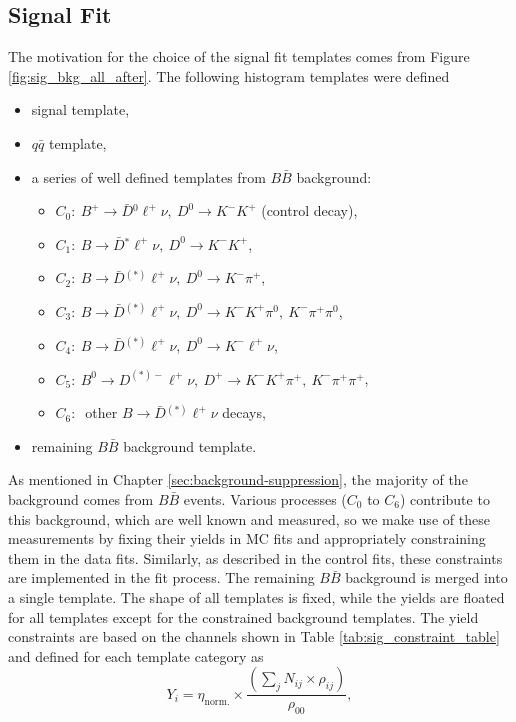 \subsection{Signal Fit}\label{sec:templates-in-signal-fits}
The motivation for the choice of the signal fit templates comes from Figure \ref{fig:sig_bkg_all_after}. The following histogram templates were defined
\begin{itemize}
	\item signal template,
	\item $q \bar q$ template,
	\item a series of well defined templates from $B \bar B$ background:
	\begin{itemize}
		\item $C_0:~B^+ \to \bar{D} {}^0 \ell^+ \nu,~D^0 \to K^-K^+$ (control decay),
		\item $C_1:~B \to \bar{D} {}^* \ell^+ \nu,~D^0 \to K^-K^+$,
		\item $C_2:~B \to \bar{D} {}^{(*)} \ell^+ \nu,~D^0 \to K^-\pi^+$,
		\item $C_3:~B \to \bar{D} {}^{(*)} \ell^+ \nu,~D^0 \to K^-K^+\pi^0,~K^-\pi^+\pi^0$,
		\item $C_4:~B \to \bar{D} {}^{(*)} \ell^+ \nu,~D^0 \to K^-\ell^+\nu$,
		\item $C_5:~B^0 \to D^{(*)-} \ell^+ \nu,~D^+ \to K^-K^+\pi^+,~K^-\pi^+\pi^+$,
		\item $C_6:~$ other $B \to \bar D {}^{(*)} \ell^+ \nu$ decays,
	\end{itemize}
	\item remaining $B \bar B$ background template.
\end{itemize}
As mentioned in Chapter \ref{sec:background-suppression}, the majority of the background comes from $B \bar B$ events. Various processes ($C_0$ to $C_6$) contribute to this background, which are well known and measured, so we make use of these measurements by fixing their yields in MC fits and appropriately constraining them in the data fits. Similarly, as described in the control fits, these constraints are implemented in the fit process. The remaining $B \bar B$ background is merged into a single template. The shape of all templates is fixed, while the yields are floated for all templates except for the constrained background templates. The yield constraints are based on the channels shown in Table \ref{tab:sig_constraint_table} and defined for each template category as 
\begin{equation}
Y_i = \eta_{\mathrm{norm.}} \times \frac{\left(\sum_j N_{ij}\times \rho_{ij} \right)}{\rho_{00}},
\label{eq:sig_fix}
\end{equation}
